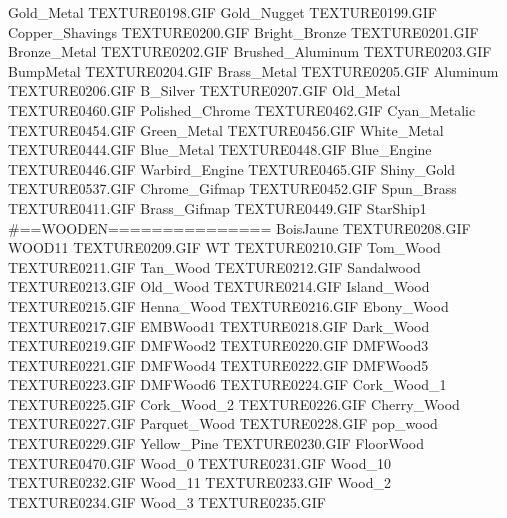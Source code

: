 Gold_Metal                     TEXTURE\TEX0198.GIF
Gold_Nugget                    TEXTURE\TEX0199.GIF
Copper_Shavings                TEXTURE\TEX0200.GIF
Bright_Bronze                  TEXTURE\TEX0201.GIF
Bronze_Metal                   TEXTURE\TEX0202.GIF
Brushed_Aluminum               TEXTURE\TEX0203.GIF
BumpMetal                      TEXTURE\TEX0204.GIF
Brass_Metal                    TEXTURE\TEX0205.GIF
Aluminum                       TEXTURE\TEX0206.GIF
B_Silver                       TEXTURE\TEX0207.GIF
Old_Metal                      TEXTURE\TEX0460.GIF
Polished_Chrome                TEXTURE\TEX0462.GIF
Cyan_Metalic                   TEXTURE\TEX0454.GIF
Green_Metal                    TEXTURE\TEX0456.GIF
White_Metal                    TEXTURE\TEX0444.GIF
Blue_Metal                     TEXTURE\TEX0448.GIF
Blue_Engine                    TEXTURE\TEX0446.GIF
Warbird_Engine                 TEXTURE\TEX0465.GIF
Shiny_Gold                     TEXTURE\TEX0537.GIF
Chrome_Gifmap                  TEXTURE\TEX0452.GIF
Spun_Brass                     TEXTURE\TEX0411.GIF
Brass_Gifmap                   TEXTURE\TEX0449.GIF
StarShip1
#==WOODEN===============
BoisJaune                      TEXTURE\TEX0208.GIF
WOOD11                         TEXTURE\TEX0209.GIF
WT                             TEXTURE\TEX0210.GIF
Tom_Wood                       TEXTURE\TEX0211.GIF
Tan_Wood                       TEXTURE\TEX0212.GIF
Sandalwood                     TEXTURE\TEX0213.GIF
Old_Wood                       TEXTURE\TEX0214.GIF
Island_Wood                    TEXTURE\TEX0215.GIF
Henna_Wood                     TEXTURE\TEX0216.GIF
Ebony_Wood                     TEXTURE\TEX0217.GIF
EMBWood1                       TEXTURE\TEX0218.GIF
Dark_Wood                      TEXTURE\TEX0219.GIF
DMFWood2                       TEXTURE\TEX0220.GIF
DMFWood3                       TEXTURE\TEX0221.GIF
DMFWood4                       TEXTURE\TEX0222.GIF
DMFWood5                       TEXTURE\TEX0223.GIF
DMFWood6                       TEXTURE\TEX0224.GIF
Cork_Wood_1                    TEXTURE\TEX0225.GIF
Cork_Wood_2                    TEXTURE\TEX0226.GIF
Cherry_Wood                    TEXTURE\TEX0227.GIF
Parquet_Wood                   TEXTURE\TEX0228.GIF
pop_wood                       TEXTURE\TEX0229.GIF
Yellow_Pine                    TEXTURE\TEX0230.GIF
FloorWood                      TEXTURE\TEX0470.GIF
Wood_0                         TEXTURE\TEX0231.GIF
Wood_10                        TEXTURE\TEX0232.GIF
Wood_11                        TEXTURE\TEX0233.GIF
Wood_2                         TEXTURE\TEX0234.GIF
Wood_3                         TEXTURE\TEX0235.GIF
